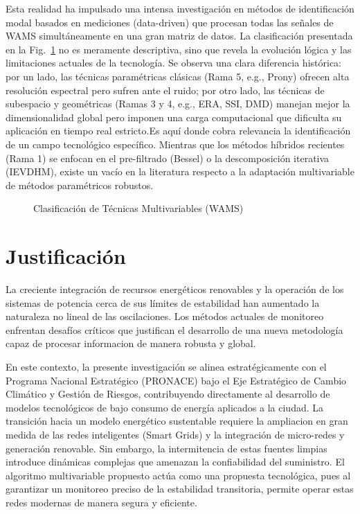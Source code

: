 Esta realidad ha impulsado una intensa investigación en métodos de identificación modal basados en mediciones (data-driven) que procesan todas las señales de WAMS simultáneamente en una gran matriz de datos. La clasificación presentada en la Fig.~\ref{fig:clasificacion_tecnicas} no es meramente descriptiva, sino que revela la evolución lógica y las limitaciones actuales de la tecnología. Se observa una clara diferencia histórica: por un lado, las técnicas paramétricas clásicas (Rama 5, e.g., Prony) ofrecen alta resolución espectral pero sufren ante el ruido; por otro lado, las técnicas de subespacio y geométricas (Ramas 3 y 4, e.g., ERA, SSI, DMD) manejan mejor la dimensionalidad global pero imponen una carga computacional que dificulta su aplicación en tiempo real estricto.Es aquí donde cobra relevancia la identificación de un campo tecnológico específico. Mientras que los métodos híbridos recientes (Rama 1) se enfocan en el pre-filtrado (Bessel) o la descomposición iterativa (IEVDHM), existe un vacío en la literatura respecto a la adaptación multivariable de métodos paramétricos robustos.

\begin{figure}[t]
    \centering
     
    \caption{Clasificación de Técnicas Multivariables (WAMS)}
    \label{fig:clasificacion_tecnicas} %
\end{figure}

\section{Justificación}

La creciente integración de recursos energéticos renovables y la operación de los sistemas de potencia cerca de sus límites de estabilidad han aumentado la naturaleza no lineal de las oscilaciones. Los métodos actuales de monitoreo enfrentan desafíos críticos que justifican el desarrollo de una nueva metodología capaz de procesar informacion de manera robusta y global.

En este contexto, la presente investigación se alinea estratégicamente con el Programa Nacional Estratégico (PRONACE) bajo el Eje Estratégico de Cambio Climático y Gestión de Riesgos, contribuyendo directamente al desarrollo de modelos tecnológicos de bajo consumo de energía aplicados a la ciudad. La transición hacia un modelo energético sustentable requiere la ampliacion en gran medida de las redes inteligentes (Smart Grids) y la integración de micro-redes y generación renovable. Sin embargo, la intermitencia de estas fuentes limpias introduce dinámicas complejas que amenazan la confiabilidad del suministro. El algoritmo multivariable propuesto actúa como una propuesta tecnológica, pues al garantizar un monitoreo preciso de la estabilidad transitoria, permite operar estas redes modernas de manera segura y eficiente.

